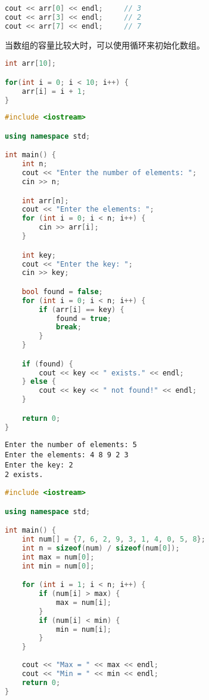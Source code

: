 \begin{lstlisting}[language=C++]
cout << arr[0] << endl;		// 3
cout << arr[3] << endl;		// 2
cout << arr[7] << endl;		// 7
\end{lstlisting}

当数组的容量比较大时，可以使用循环来初始化数组。

\vspace{-0.5cm}

\begin{lstlisting}[language=C++]
int arr[10];

for(int i = 0; i < 10; i++) {
	arr[i] = i + 1;
}
\end{lstlisting}

\vspace{0.5cm}


\begin{lstlisting}[language=C++]
#include <iostream>

using namespace std;

int main() {
	int n;
	cout << "Enter the number of elements: ";
	cin >> n;

	int arr[n];
	cout << "Enter the elements: ";
	for (int i = 0; i < n; i++) {
		cin >> arr[i];
	}

	int key;
	cout << "Enter the key: ";
	cin >> key;

	bool found = false;
	for (int i = 0; i < n; i++) {
		if (arr[i] == key) {
			found = true;
			break;
		}
	}

	if (found) {
		cout << key << " exists." << endl;
	} else {
		cout << key << " not found!" << endl;
	}

	return 0;
}
\end{lstlisting}

\begin{tcolorbox}
	\begin{verbatim}
Enter the number of elements: 5
Enter the elements: 4 8 9 2 3
Enter the key: 2
2 exists.
	\end{verbatim}
\end{tcolorbox}

\vspace{0.5cm}


\begin{lstlisting}[language=C++]
#include <iostream>

using namespace std;

int main() {
	int num[] = {7, 6, 2, 9, 3, 1, 4, 0, 5, 8};
	int n = sizeof(num) / sizeof(num[0]);
	int max = num[0];
	int min = num[0];

	for (int i = 1; i < n; i++) {
		if (num[i] > max) {
			max = num[i];
		}
		if (num[i] < min) {
			min = num[i];
		}
	}
	
	cout << "Max = " << max << endl;
	cout << "Min = " << min << endl;
	return 0;
}
\end{lstlisting}

